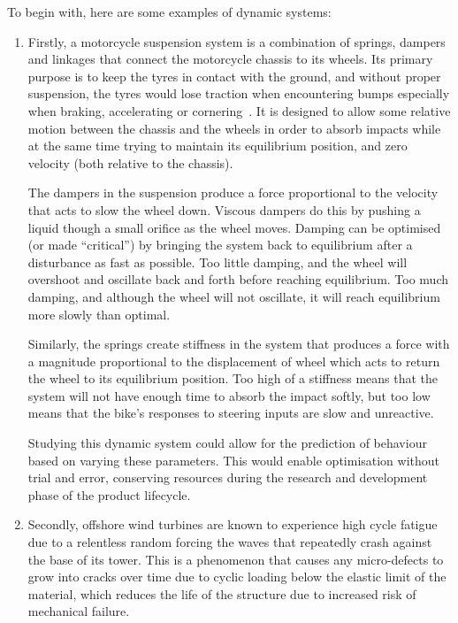 \documentclass[12pt]{article}
\begin{document}
    To begin with, here are some examples of dynamic systems:
    \begin{enumerate}[listparindent=\parindent]
        \item Firstly, a motorcycle suspension system is a combination of springs, dampers and linkages that connect the motorcycle chassis to its wheels.
        Its primary purpose is to keep the tyres in contact with the ground, and without proper suspension, the tyres would lose traction when encountering bumps especially when braking, accelerating or cornering~\cite{UTI2020MotorcycleSuspension}.
        It is designed to allow some relative motion between the chassis and the wheels in order to absorb impacts while at the same time trying to maintain its equilibrium position, and zero velocity (both relative to the chassis).

        The dampers in the suspension produce a force proportional to the velocity that acts to slow the wheel down.
        Viscous dampers do this by pushing a liquid though a small orifice as the wheel moves.
        Damping can be optimised (or made ``critical'') by bringing the system back to equilibrium after a disturbance as fast as possible.
        Too little damping, and the wheel will overshoot and oscillate back and forth before reaching equilibrium.
        Too much damping, and although the wheel will not oscillate, it will reach equilibrium more slowly than optimal.

        Similarly, the springs create stiffness in the system that produces a force with a magnitude proportional to the displacement of wheel which acts to return the wheel to its equilibrium position.
        Too high of a stiffness means that the system will not have enough time to absorb the impact softly, but too low means that the bike's responses to steering inputs are slow and unreactive.

        Studying this dynamic system could allow for the prediction of behaviour based on varying these parameters.
        This would enable optimisation without trial and error, conserving resources during the research and development phase of the product lifecycle.

        \item Secondly, offshore wind turbines are known to experience high cycle fatigue due to a relentless random forcing the waves that repeatedly crash against the base of its tower.
        This is a phenomenon that causes any micro-defects to grow into cracks over time due to cyclic loading below the elastic limit of the material, which reduces the life of the structure due to increased risk of mechanical failure.


\end{enumerate}
\end{document}
